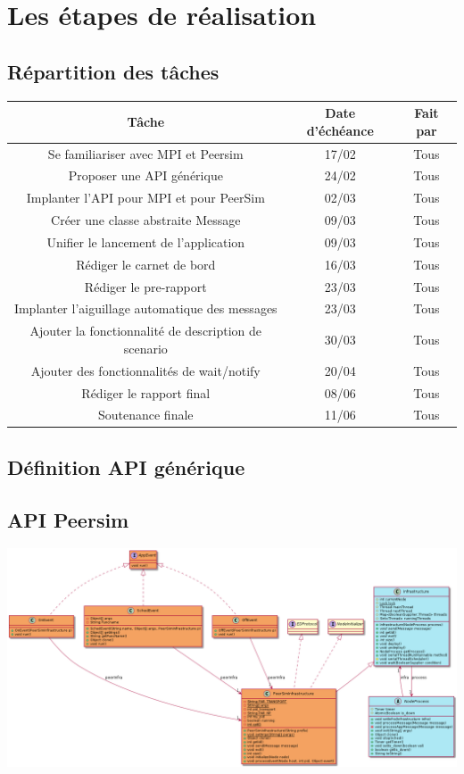 \documentclass{article}
\begin{document}
		\section{Les étapes de réalisation}
			
			\subsection{Répartition des tâches}
			\begin{tabular}{|c|c|c|}
				\hline
				Tâche & Date d'échéance & Fait par\\[1mm]
				\hline
		  		Se familiariser avec MPI et Peersim & 17/02 & Tous\\[1mm]
				\hline
				Proposer une API générique & 24/02 & Tous\\[1mm]
				\hline
				Implanter l'API pour MPI et pour PeerSim & 02/03 & Tous \\[1mm]
				\hline
				Créer une classe abstraite Message & 09/03 & Tous\\[1mm]
				\hline
				Unifier le lancement de l'application & 09/03 & Tous\\[1mm]
				\hline
				Rédiger le carnet de bord & 16/03 & Tous\\[1mm]
				\hline
				Rédiger le pre-rapport & 23/03 & Tous\\[1mm]
				\hline 
				Implanter l'aiguillage automatique des messages & 23/03 & Tous\\[1mm]
				\hline
				Ajouter la fonctionnalité de description de scenario & 30/03 & Tous\\[1mm]
				\hline
				Ajouter des fonctionnalités de wait/notify & 20/04 & Tous\\[1mm]
				\hline 
				Rédiger le rapport final & 08/06 & Tous\\[1mm]
				\hline
				Soutenance finale & 11/06 & Tous\\[1mm]
				\hline
			\end{tabular}			
			\newpage			
			\subsection{Définition API générique}
			\subsection*{API Peersim}
			\vspace{5mm}
			\hspace*{-2.2cm} \includegraphics[width=20cm]{uml/uml_peersim_1.png}
\end{document}
